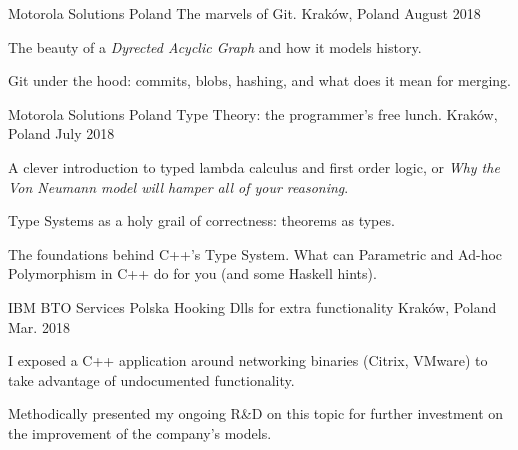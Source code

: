 
\begin{cventries}

\cventry
    {Motorola Solutions Poland} %
    {The marvels of Git.} %
    {Kraków, Poland} %
    {August 2018} %
    {
        \begin{cvitems} %
            \item {The beauty of a \textit{Dyrected Acyclic Graph} and how it models history.}
            \item {Git under the hood: commits, blobs, hashing, and what does it mean for merging.}
        \end{cvitems}
    }

  \cventry
    {Motorola Solutions Poland} %
    {Type Theory: the programmer's free lunch.} %
    {Kraków, Poland} %
    {July 2018} %
    {
        \begin{cvitems} %
            \item {A clever introduction to typed lambda calculus and first order logic, or \textit{Why the Von Neumann model will hamper all of your reasoning}.}
            \item {Type Systems as a holy grail of correctness: theorems as types.}
            \item {The foundations behind C++'s Type System. What can Parametric and Ad-hoc Polymorphism in C++ do for you (and some Haskell hints).}
        \end{cvitems}
    }

  \cventry
    {IBM BTO Services Polska} %
    {Hooking Dlls for extra functionality} %
    {Kraków, Poland} %
    {Mar. 2018} %
    {
        \begin{cvitems} %
            \item {I exposed a C++ application around networking binaries (Citrix, VMware) to take advantage of undocumented functionality.}
            \item {Methodically presented my ongoing R\&D on this topic for further investment on the improvement of the company's models.}
        \end{cvitems}
    }


\end{cventries}
